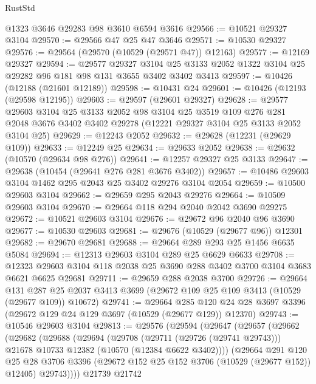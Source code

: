 \begin{lexlean}{RustStd}
\begin{coremodule}
    @1323
    @3646
    @29283
    @98
    @3610
    @6594
    @3616
@29566 := @10521 @29327 @3104
@29570 := @29566 @47 @25 @47 @3646
@29571 := @10530 @29327
@29576 := @29564 (@29570 (@10529 (@29571 @47)) @12163)
@29577 := @12169 @29327
@29594 := @29577
    @29327
    @3104
    @25
    @3133
    @2052
    @1322
    @3104
    @25
    @29282
    @96
    @181
    @98
    @131
    @3655
    @3402
    @3402
    @3413
@29597 := @10426 (@12188 (@21601 @12189))
@29598 := @10431 @24
@29601 := @10426 (@12193 (@29598 @12195))
@29603 := @29597 (@29601 @29327)
@29628 := @29577
    @29603
    @3104
    @25
    @3133
    @2052
    @98
    @3104
    @25
    @3519
    @109
    @276
    @281
    @2048
    @3676
    @3402
    @3402
    @29278
    (@12221 @29327 @3104 @25 @3133 @2052 @3104 @25)
@29629 := @12243 @2052
@29632 := @29628 (@12231 (@29629 @109))
@29633 := @12249 @25
@29634 := @29633 @2052
@29638 := @29632 (@10570 (@29634 @98 @276))
@29641 := @12257 @29327 @25 @3133
@29647 := @29638 (@10454 (@29641 @276 @281 @3676 @3402))
@29657 := @10486 @29603 @3104 @1462 @295 @2043 @25 @3402 @29276 @3104 @2054
@29659 := @10500 @29603 @3104
@29662 := @29659 @295 @2043 @29276
@29664 := @10509 @29603 @3104
@29670 := @29664 @118 @294 @2040 @2042 @3690 @29275
@29672 := @10521 @29603 @3104
@29676 := @29672 @96 @2040 @96 @3690
@29677 := @10530 @29603
@29681 := @29676 (@10529 (@29677 @96)) @12301
@29682 := @29670 @29681
@29688 := @29664 @289 @293 @25 @1456 @6635 @5084
@29694 := @12313 @29603 @3104 @289 @25 @6629 @6633
@29708 := @12323 @29603 @3104 @118 @2038 @25 @3690 @288 @3402 @3700 @3104 @3683 @6621 @6625 @29681
@29711 := @29659 @288 @2038 @3700
@29726 := @29664
    @131
    @287
    @25
    @2037
    @3413
    @3699
    (@29672 @109 @25 @109 @3413 (@10529 (@29677 @109)) @10672)
@29741 := @29664
    @285
    @120
    @24
    @28
    @3697
    @3396
    (@29672 @129 @24 @129 @3697 (@10529 (@29677 @129)) @12370)
@29743 := @10546 @29603 @3104
@29813 := @29576
    (@29594
      (@29647
        (@29657
          (@29662
            (@29682
              (@29688
                (@29694
                  (@29708
                    (@29711 (@29726 (@29741 @29743)))
                    @21678
                    @10733
                    @12382
                    (@10570 (@12384 @6622 @3402))))
                (@29664
                  @291
                  @120
                  @25
                  @28
                  @3706
                  @3396
                  (@29672 @152 @25 @152 @3706 (@10529 (@29677 @152)) @12405)
                  @29743))))
          @21739
          @21742

\end{coremodule}
\end{lexlean}
